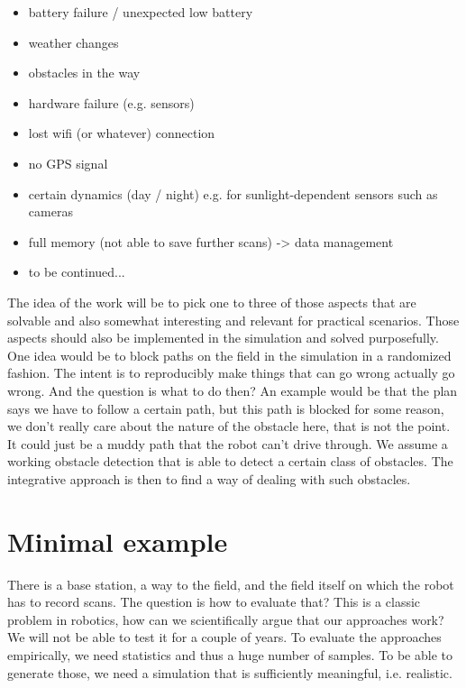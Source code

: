 \documentclass[german, master, expose, latin1]{base/thesis_KBS}
\begin{document}
\begin{itemize}
    \item battery failure / unexpected low battery
    \item weather changes
    \item obstacles in the way
    \item hardware failure (e.g. sensors)
    \item lost wifi (or whatever) connection
    \item no GPS signal
    \item certain dynamics (day / night) e.g. for sunlight-dependent sensors such as cameras
    \item full memory (not able to save further scans) -> data management
    \item to be continued...
\end{itemize}

The idea of the work will be to pick one to three of those aspects that are solvable and also somewhat interesting and relevant for practical scenarios.
Those aspects should also be implemented in the simulation and solved purposefully.\newline
One idea would be to block paths on the field in the simulation in a randomized fashion. The intent is to reproducibly make things that can go wrong actually go wrong.
And the question is what to do then? An example would be that the plan says we have to follow a certain path, but this path is blocked for some reason, we don't really
care about the nature of the obstacle here, that is not the point. It could just be a muddy path that the robot can't drive through. We assume a working obstacle detection
that is able to detect a certain class of obstacles. The integrative approach is then to find a way of dealing with such obstacles.

\section{Minimal example}

There is a base station, a way to the field, and the field itself on which the robot has to record scans. The question is how to evaluate that?
This is a classic problem in robotics, how can we scientifically argue that our approaches work? We will not be able to test it for a couple of years.
To evaluate the approaches empirically, we need statistics and thus a huge number of samples. To be able to generate those, we need a simulation
that is sufficiently meaningful, i.e. realistic.
\end{document}
